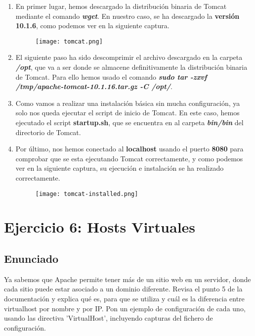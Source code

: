 \begin{enumerate}
    \item En primer lugar, hemos descargado la distribución binaria de Tomcat mediante el comando \textbf{\textit{wget}}. En nuestro caso, se ha descargado la \textbf{versión 10.1.6}, como podemos ver en la siguiente captura.

    \begin{figure}[H]
        \centering
        \texttt{[image: tomcat.png]}
    \end{figure}

    \item El siguiente paso ha sido descomprimir el archivo descargado en la carpeta \textbf{\textit{/opt}}, que va a ser donde se almacene definitivamente la distribución binaria de Tomcat. Para ello hemos usado el comando \textbf{\textit{sudo tar -zxvf /tmp/apache-tomcat-10.1.16.tar.gz -C /opt/}}.

    \item Como vamos a realizar una instalación básica sin mucha configuración, ya solo nos queda ejecutar el script de inicio de Tomcat. En este caso, hemos ejecutado el script \textbf{startup.sh}, que se encuentra en al carpeta \textbf{\textit{bin/bin}} del directorio de Tomcat.

    \item Por último, nos hemos conectado al \textbf{localhost} usando el puerto \textbf{8080} para comprobar que se esta ejecutando Tomcat correctamente, y como podemos ver en la siguiente captura, su ejecución e instalación se ha realizado correctamente.

    \begin{figure}[H]
        \centering
        \texttt{[image: tomcat-installed.png]}
    \end{figure}
\end{enumerate}

\section{Ejercicio 6: Hosts Virtuales}
\subsection{Enunciado}
Ya sabemos que Apache permite tener más de un sitio web en un servidor, donde cada sitio puede estar asociado a un dominio diferente. Revisa el punto 5 de la documentación y explica qué es, para que se utiliza y cuál es la diferencia entre virtualhost por nombre y por IP. Pon un ejemplo de configuración de cada uno, usando las directiva 'VirtualHost', incluyendo capturas del fichero de configuración.

